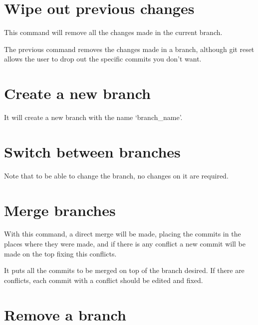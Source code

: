 \section*{Wipe out previous changes}

\noindent{}

This command will remove all the changes made in the current branch.

\noindent{}

The previous command removes the changes made in a branch, although git reset allows the user to drop out the specific commits you don't want.

\section*{Create a new branch}

\noindent{}

It will create a new branch with the name `branch\_name'.

\section*{Switch between branches}

\noindent{}

Note that to be able to change the branch, no changes on it are required.

\newpage
\section*{Merge branches}

\noindent{}

With this command, a direct merge will be made, placing the commits in the places where they were made, and if there is any conflict a new commit will be made on the top fixing this conflicts.

\noindent{}

It puts all the commits to be merged on top of the branch desired.  If there are conflicts, each commit with a conflict should be edited and fixed.

\section*{Remove a branch}

\noindent{}

